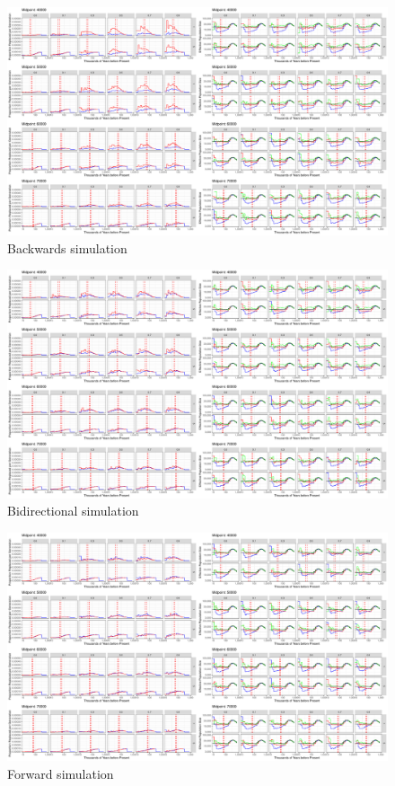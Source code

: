 \documentclass{article}
\begin{document}
\begin{figure}
	\centering
	\includegraphics[width=\textwidth]{../plot/sims/backward_different_starts.pdf}
	\caption{Backwards simulation}
	\label{fig:backsim}
\end{figure}


\begin{figure}
	\centering
	\includegraphics[width=\textwidth]{../plot/sims/bidirectional_different_starts.pdf}
	\caption{Bidirectional simulation}
	\label{fig:bisim}
\end{figure}

\begin{figure}
	\centering
	\includegraphics[width=\textwidth]{../plot/sims/forward_different_starts.pdf}
	\caption{Forward simulation}
	\label{fig:fwdsim}
\end{figure}
\end{document}
